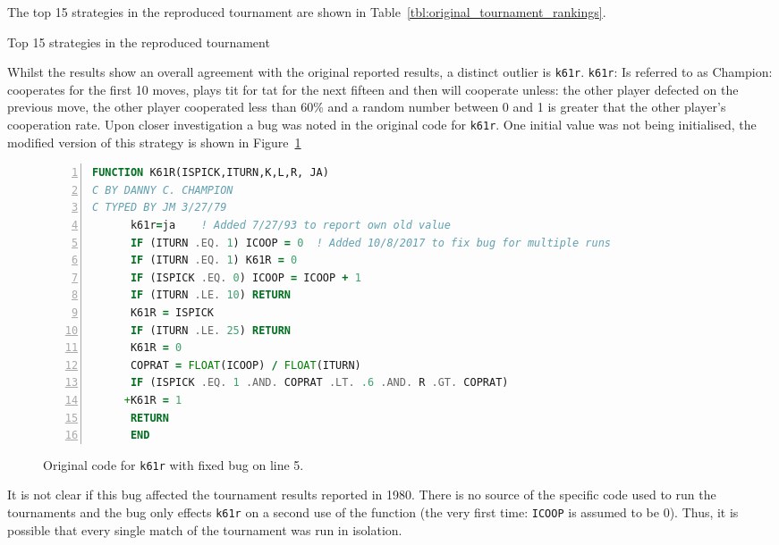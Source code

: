 \documentclass{article}
\begin{document}
The top 15 strategies in the reproduced tournament are shown in
Table~\ref{tbl:original_tournament_rankings}.

\begin{table}[!hbtp]
        \centering
        
        \caption{Top 15 strategies in the reproduced tournament}
        \label{tbl:original_tournament_rankings}
\end{table}

Whilst the results show an overall agreement with the original reported results,
a distinct outlier is \texttt{k61r}.
\texttt{k61r}: Is referred to as Champion: cooperates for the first 10
moves, plays tit for tat for the next fifteen and then will cooperate
unless: the other player defected on the previous move, the
other player cooperated less than 60\% and a random number between
0 and 1 is greater that the other player's cooperation rate.
Upon closer investigation a bug was noted in the original code for
\texttt{k61r}. One initial value was not being initialised, the modified version
of this strategy is shown in Figure~\ref{fig:k61r}

\begin{figure}[!hbtp]
    \begin{center}
        \begin{lstlisting}[language=Fortran,
                           basicstyle=\ttfamily,
                           frame=single,
                           keywordstyle=\color{red},
                           numbers=left,
                           commentstyle=\color{green}]
      FUNCTION K61R(ISPICK,ITURN,K,L,R, JA)
C BY DANNY C. CHAMPION
C TYPED BY JM 3/27/79
      k61r=ja    ! Added 7/27/93 to report own old value
      IF (ITURN .EQ. 1) ICOOP = 0  ! Added 10/8/2017 to fix bug for multiple runs
      IF (ITURN .EQ. 1) K61R = 0
      IF (ISPICK .EQ. 0) ICOOP = ICOOP + 1
      IF (ITURN .LE. 10) RETURN
      K61R = ISPICK
      IF (ITURN .LE. 25) RETURN
      K61R = 0
      COPRAT = FLOAT(ICOOP) / FLOAT(ITURN)
      IF (ISPICK .EQ. 1 .AND. COPRAT .LT. .6 .AND. R .GT. COPRAT)
     +K61R = 1
      RETURN
      END
        \end{lstlisting}
        \caption{Original code for \texttt{k61r} with fixed bug on line 5.}
        \label{fig:k61r}
    \end{center}
\end{figure}

It is not clear if this bug affected the tournament results reported in 1980.
There is no source of the specific code used to run the tournaments and
the bug only effects \texttt{k61r} on a second use of the function (the very
first time: \texttt{ICOOP} is assumed to be 0). Thus, it is possible that every
single match of the tournament was run in isolation.
\end{document}
